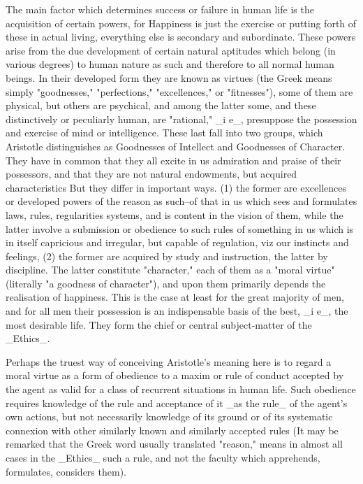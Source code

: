 The main factor which determines success or failure in human life is the
acquisition of certain powers, for Happiness is just the exercise or
putting forth of these in actual living, everything else is secondary
and subordinate. These powers arise from the due development of certain
natural aptitudes which belong (in various degrees) to human nature as
such and therefore to all normal human beings. In their developed
form they are known as virtues (the Greek means simply "goodnesses,"
"perfections," "excellences," or "fitnesses"), some of them are
physical, but others are psychical, and among the latter some, and these
distinctively or peculiarly human, are "rational," _i e_, presuppose the
possession and exercise of mind or intelligence. These last fall into
two groups, which Aristotle distinguishes as Goodnesses of Intellect and
Goodnesses of Character. They have in common that they all excite in us
admiration and praise of their possessors, and that they are not natural
endowments, but acquired characteristics But they differ in important
ways. (1) the former are excellences or developed powers of the
reason as such--of that in us which sees and formulates laws, rules,
regularities systems, and is content in the vision of them, while the
latter involve a submission or obedience to such rules of something
in us which is in itself capricious and irregular, but capable of
regulation, viz our instincts and feelings, (2) the former are acquired
by study and instruction, the latter by discipline. The latter
constitute "character," each of them as a "moral virtue" (literally "a
goodness of character"), and upon them primarily depends the realisation
of happiness. This is the case at least for the great majority of men,
and for all men their possession is an indispensable basis of the
best, _i e_, the most desirable life. They form the chief or central
subject-matter of the _Ethics_.

Perhaps the truest way of conceiving Aristotle's meaning here is to
regard a moral virtue as a form of obedience to a maxim or rule of
conduct accepted by the agent as valid for a class of recurrent
situations in human life. Such obedience requires knowledge of the rule
and acceptance of it _as the rule_ of the agent's own actions, but not
necessarily knowledge of its ground or of its systematic connexion with
other similarly known and similarly accepted rules (It may be remarked
that the Greek word usually translated "reason," means in almost all
cases in the _Ethics_ such a rule, and not the faculty which apprehends,
formulates, considers them).

